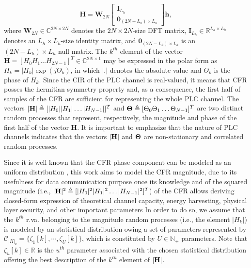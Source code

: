 \documentclass[journal]{IEEEtran}
\begin{document}
\begin{equation}
\mathbf{H} = \mathbf{W}_{2N}  \begin{bmatrix} \mathbf{I}_{L_h} \\ \mathbf{0}_{(2N-L_{h})\times L_{h}} \end{bmatrix} \mathbf{h},
\end{equation}
where $\mathbf{W}_{2N} \in \mathbb{C}^{2N\times 2N}$ denotes the $2N \times 2N$-size \ac{DFT} matrix, $ \mathbf{I}_{L_h} \in \mathbb{R}^{L_h\times L_h}$ denotes an $L_h\times L_h$-size identity matrix, and $ \mathbf{0}_{(2N-L_{h})\times L_{h}} $ is an $ (2N-L_{h})\times L_{h}$ null matrix. The $k^{th}$ element of the vector $\mathbf{H}=[H_0 H_1 \ldots H_{2N-1}]^T \in \mathbb{C}^{2N\times 1}$ may be expressed in the polar form as $H_k=|H_k|\exp(j \Theta_k)$, in which $|.|$ denotes the absolute value and $\Theta_k$ is the phase of $H_k$. Since the \ac{CIR} of the \ac{PLC} channel is real-valued, it means that \ac{CFR} posses the hermitian symmetry property and, as a consequence, the first half of samples of the \ac{CFR} are sufficient for representing the whole \ac{PLC} channel. The vectors $|{\bf H}|\triangleq [|H_0||H_1|\ldots |H_{N-1}|]^T$ and ${\bf \Theta}\triangleq[\Theta_0\Theta_1\ldots \Theta_{N-1}]^T$ are two distinct random processes that represent, respectively, the magnitude and phase of the first half of the vector $\mathbf{H}$. It is important to emphasize that the nature of \ac{PLC} channels indicates that the vectors $|{\bf H}|$ and ${\bf \Theta}$ are non-stationary and correlated random processes. 

Since it is well known that the \ac{CFR} phase component can be modeled as an uniform distribution \cite{unif_phase}, this work aims to model the \ac{CFR} magnitude, due to its usefulness for data communication purpose once its knowledge and of the squared magnitude (i.e.,  $|{\bf H}|^2\triangleq[|H_0|^2|H_1|^2\ldots |H_{N-1}|^2]^T$) of the \ac{CFR} allows deriving closed-form expression of theoretical channel capacity, energy harvesting, physical layer security, and other important parameters In order to do so, we assume that the $k^{th}$ \ac{r.va.} belonging to the magnitude random processes (i.e., the element $|H_k|$) is modeled by an statistical distribution owing a set of parameters represented by $\mathcal{C}_{|H|_k} = \{ \zeta_{1}[k], \cdots, \zeta_{U}[k] \}$, which is constituted by $U \in \mathbb{N}_+$ parameters. Note that $\zeta_{u}[k] \in \mathbb{R}$ is the $u^{th}$ parameter associated with the chosen statistical distribution offering the best description of the $k^{th}$ element of $|{\bf H}|$.
\end{document}
